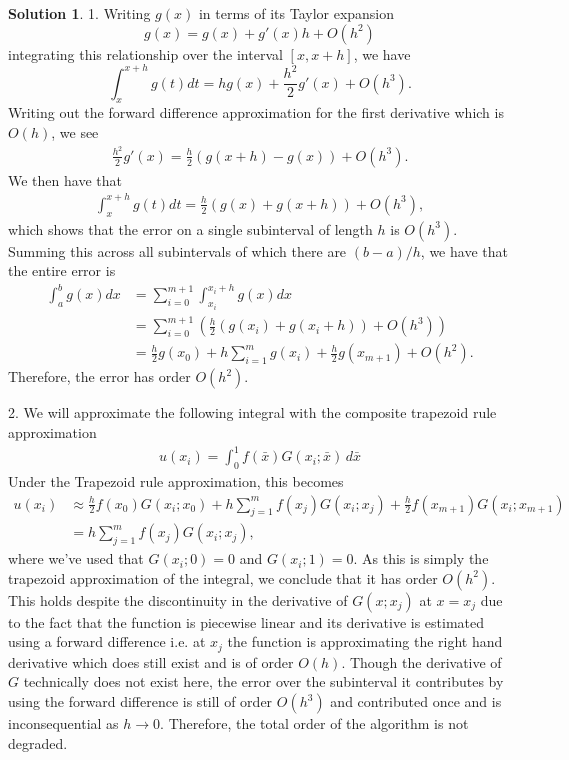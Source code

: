 \documentclass[12pt]{article}
\theoremstyle{definition}
\newtheorem{sol}{Solution}
\theoremstyle{remark}
\begin{document}
\begin{sol}
1. Writing $g(x)$ in terms of its Taylor expansion
\begin{equation*}
    g(x) = g(x) + g'(x) h + O(h^{2})
\end{equation*}
integrating this relationship over the interval $[x, x+h]$, we have
\begin{equation*}
\int_{x}^{x+h} g(t)dt = h g(x) + \frac{h^{2}}{2} g'(x) + O(h^{3}).
\end{equation*}
Writing out the forward difference approximation for the first derivative which is $O(h)$, we see
\begin{align*}
    \frac{h^{2}}{2} g'(x) =  \frac{h}{2} ( g(x+h) - g(x)) + O(h^{3}).
\end{align*}
We then have that
\begin{align*}
    \int_{x}^{x+h} g(t)dt = \frac{h}{2} (g(x) + g(x+h)) + O(h^{3}),
\end{align*}
which shows that the error on a single subinterval of length $h$ is $O(h^{3})$. Summing this across all subintervals of which there are $(b - a )/ h$, we have that the entire error is 
\begin{align*}
    \int_{a}^{b} g(x)dx &= \sum_{i = 0}^{m+1} \int_{x_{i}}^{x_{i} + h} g(x) dx\\
                        &=\sum_{i = 0}^{m+1} \left(  \frac{h}{2} (g(x_{i}) + g(x_{i}+h)) + O(h^{3}) \right )\\
                        &= \frac{h}{2} g(x_{0}) + h \sum_{i = 1}^{m} g(x_{i}) + \frac{h}{2} g(x_{m+1}) + O(h^{2}).
\end{align*}
Therefore, the error has order $O(h^{2})$.


2. We will approximate the following integral with the composite trapezoid rule approximation
\begin{align*}
u(x_{i}) = \int_0^1 f( \bar{x} ) G(x_{i}; \bar{x} )\,d \bar{x} 
\end{align*}
Under the Trapezoid rule approximation, this becomes
\begin{align}
    u(x_{i}) &\approx \frac{h}{2} f( x_0 ) G( x_i ; x_0 ) + h \sum_{j = 1}^{m} f( x_j ) G( x_i ; x_j )  + \frac{h}{2} f( x_{m+1} ) G( x_{i} ; x_{m+1} ) \\ 
             &=  h \sum_{j = 1}^{m} f( x_j ) G( x_i ; x_j ),
\end{align}
where we've used that $G(x_{i}; 0) = 0$ and $G(x_{i}; 1) = 0$. As this is simply the trapezoid approximation of the integral, we conclude that it has order $O(h^{2})$. This holds despite the discontinuity in the derivative of $G(x ; x_{j})$ at $x = x_{j}$ due to the fact that the function is piecewise linear and its derivative is estimated using a forward difference i.e. at $x_{j}$ the function is approximating the right hand derivative which does still exist and is of order $O(h)$. Though the derivative of $G$ technically does not exist here, the error over the subinterval it contributes by using the forward difference is still of order $O(h^{3})$ and contributed once and is inconsequential as $h\to 0$. Therefore, the total order of the algorithm is not degraded. 
\end{sol}
\end{document}
